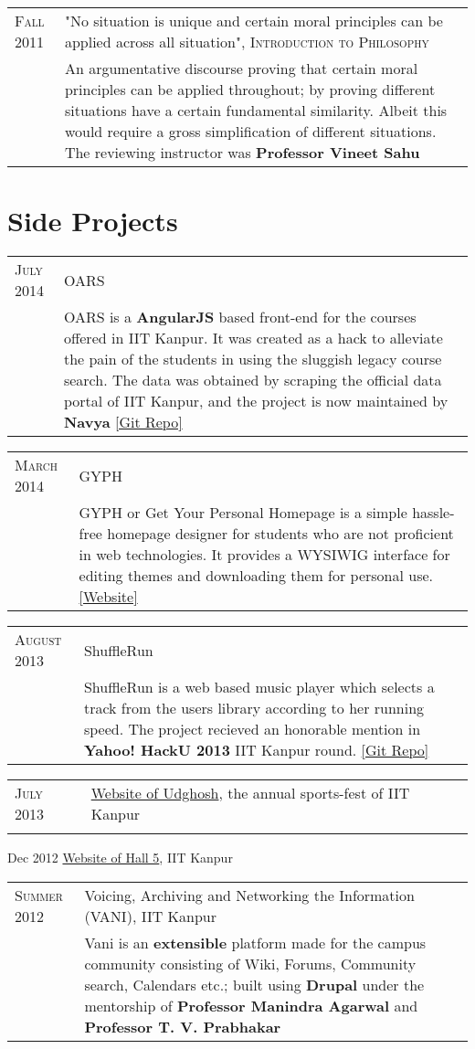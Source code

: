 \documentclass[a4paper,10pt]{article} %
\newcommand{\project}[3]{
    \begin{tabular}{>{\raggedleft}p{2.2cm}|p{15cm}}
        \textsc{#1} & #2 \\
                    & \footnotesize{#3} \\
    \end{tabular}
}
\begin{document}
\project {Fall 2011}
         {"No situation is unique and certain moral principles can be applied across all situation",
          \textsc{Introduction to Philosophy}}
         {An argumentative discourse proving that certain moral principles
          can be applied throughout; by proving different situations have a certain
          fundamental similarity.  Albeit this would require a gross simplification of
          different situations.  The reviewing instructor was \textbf{Professor Vineet Sahu}}

\section{Side Projects}

\project {July 2014}
         {OARS}
         {OARS is a \textbf{AngularJS} based front-end for the
          courses offered in IIT Kanpur. It was created as a
          hack to alleviate the pain of the students in using the
          sluggish legacy course search. The data was obtained by
          scraping the official data portal of IIT Kanpur, and the
          project is now maintained by \textbf{Navya}
          \href{https://github.com/navya/oars} {[Git Repo]} }

\project {March 2014}
         {GYPH}
         {GYPH or Get Your Personal Homepage
          is a simple hassle-free homepage designer for students who are not
          proficient in web technologies. It provides a WYSIWIG
          interface for editing themes and downloading them for personal use.
          \href{http://gyph2.herokuapp.com/} {[Website]} }

\project {August 2013}
         {ShuffleRun}
         {ShuffleRun is a web based music player which selects a track from the
          users library according to her running speed.
          The project recieved an honorable mention in \textbf{Yahoo!  HackU 2013} IIT Kanpur round.
          \href{https://github.com/srijanshetty/ShuffleRun} {[Git Repo]}}

\project {July 2013}
         {\href{www.udghosh.org}{Website of Udghosh}, the annual sports-fest of IIT Kanpur}

\project {Dec 2012}
         {\href{http://www.iitk.ac.in/hall5}{Website of Hall 5}, IIT Kanpur }

\project {Summer 2012}
         {Voicing, Archiving and Networking the Information \textsc{(VANI)}, IIT Kanpur}
         {Vani is an \textbf{extensible} platform
          made for the campus community consisting of Wiki, Forums,
          Community search, Calendars etc.; built using \textbf{Drupal}
          under the mentorship of \textbf{Professor Manindra Agarwal} and
          \textbf{Professor T. V. Prabhakar} }
\end{document}
